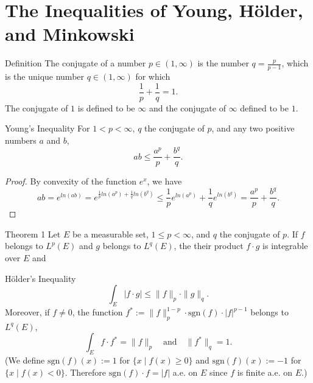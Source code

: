 \section{The Inequalities of Young, H\"older, and Minkowski}

\begin{namedthm*}{Definition}
	The conjugate of a number $p\in(1,\infty)$ is the number $q=\frac{p}{p-1}$, which is the unique number $q\in(1,\infty)$ for which 
	\[
		\frac{1}{p}+\frac{1}{q}=1.
	\]
	The conjugate of $1$ is defined to be $\infty$ and the conjugate of $\infty$ defined to be $1$.
\end{namedthm*}
\begin{namedthm*}{Young's Inequality}
	For $1<p<\infty$, $q$ the conjugate of $p$, and any two positive numbers $a$ and $b$,
	\[	
		ab\le\frac{a^p}{p}+\frac{b^q}{q}.
	\]
\end{namedthm*}
\begin{proof}
	By convexity of the function $e^x$, we have
	\[
		ab=e^{ln(ab)}=e^{\frac{1}{p}ln(a^p)+\frac{1}{q}ln(b^q)}\le \frac{1}{p}e^{ln(a^p)}+\frac{1}{q}e^{ln(b^q)}=\frac{a^p}{p}+\frac{b^q}{q}.
	\]	
\end{proof}
\begin{namedthm*}{Theorem 1}
	Let $E$ be a measurable set, $1\le p<\infty$, and $q$ the conjugate of $p$.
	If $f$ belongs to $L^p(E)$ and $g$ belongs to $L^q(E)$, the their product $f\cdot g$ is integrable over $E$ and
\end{namedthm*}
\begin{namedthm*}{H\"older's Inequality}
	\[
		\int_E|f\cdot g|\le\|f\|_p\cdot\|g\|_q.
	\]
	Moreover, if $f\neq0$, the function $f^*:=\|f\|_p^{1-p}\cdot\text{sgn}(f)\cdot|f|^{p-1}$ belongs to $L^q(E)$,
	\[
		\int_Ef\cdot f^*=\|f\|_p\quad\text{and}\quad\|f^*\|_q=1.
	\]
	(We define $\text{sgn}(f)(x):=1$ for $\{x\mid f(x)\ge0\}$ and $\text{sgn}(f)(x):=-1$ for $\{x\mid f(x)<0\}$.
	Therefore $\text{sgn}(f)\cdot f=|f|$ a.e. on $E$ since $f$ is finite a.e. on $E$.)
\end{namedthm*}
